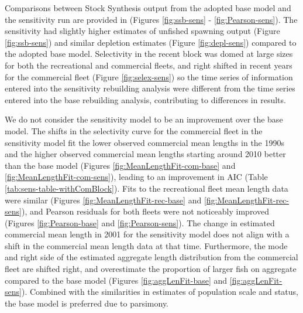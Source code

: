 \documentclass[11pt,
  english,
  letterpaper,
]{article}
\begin{document}
\leavevmode\tagmcend\tagstructend\par


Comparisons between Stock Synthesis output from the adopted base model and the sensitivity run are provided in (Figures \ref{fig:ssb-sens} - \ref{fig:Pearson-sens}). The sensitivity had slightly higher estimates of unfished spawning output (Figure \ref{fig:ssb-sens}) and similar depletion estimates (Figure \ref{fig:depl-sens}) compared to the adopted base model. Selectivity in the recent block was domed at large sizes for both the recreational and commercial fleets, and right shifted in recent years for the commercial fleet (Figure \ref{fig:selex-sens}) so the time series of information entered into the sensitivity rebuilding analysis were different from the time series entered into the base rebuilding analysis, contributing to differences in results.

\leavevmode\tagmcend\tagstructend\par


We do not consider the sensitivity model to be an improvement over the base model. The shifts in the selectivity curve for the commercial fleet in the sensitivity model fit the lower observed commercial mean lengths in the 1990s and the higher observed commercial mean lengths starting around 2010 better than the base model (Figures \ref{fig:MeanLengthFit-com-base} and \ref{fig:MeanLengthFit-com-sens}), leading to an improvement in AIC (Table \ref{tab:sens-table-withComBlock}). Fits to the recreational fleet mean length data were similar (Figures \ref{fig:MeanLengthFit-rec-base} and \ref{fig:MeanLengthFit-rec-sens}), and Pearson residuals for both fleets were not noticeably improved (Figures \ref{fig:Pearson-base} and \ref{fig:Pearson-sens}). The change in estimated commercial mean length in 2001 for the sensitivity model does not align with a shift in the commercial mean length data at that time. Furthermore, the mode and right side of the estimated aggregate length distribution from the commercial fleet are shifted right, and overestimate the proportion of larger fish on aggregate compared to the base model (Figures \ref{fig:aggLenFit-base} and \ref{fig:aggLenFit-sens}). Combined with the similarities in estimates of population scale and status, the base model is preferred due to parsimony.

\leavevmode\tagmcend\tagstructend\par
\end{document}
